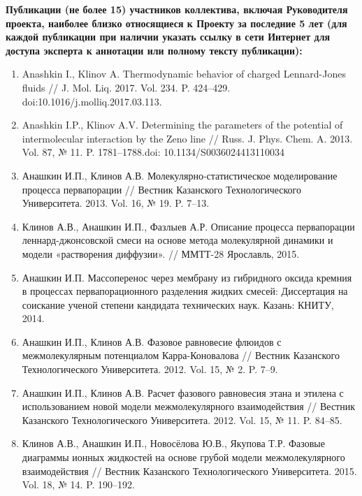 \textbf{Публикации (не более 15) участников коллектива, включая Руководителя проекта, наиболее близко относящиеся к Проекту за последние 5 лет (для каждой публикации при наличии указать ссылку в сети Интернет для доступа эксперта к аннотации или полному тексту публикации):}
\begin{enumerate}
	\item Anashkin I., Klinov A. Thermodynamic behavior of charged Lennard-Jones fluids // J. Mol. Liq. 2017. Vol. 234. P. 424–429. doi:10.1016/j.mol\-liq.2017.03.113.
	\item	Anashkin I.P., Klinov A.V. Determining the parameters of the potential of intermolecular interaction by the Zeno line // Russ. J. Phys. Chem. A. 2013. Vol. 87, № 11. P. 1781–1788.doi: 10.1134/S0036024413110034
	\item	Анашкин И.П., Клинов А.В. Молекулярно-статистическое моделирование процесса первапорации // Вестник Казанского Технологического Университета. 2013. Vol. 16, № 19. P. 7–13.
	\item	Клинов А.В., Анашкин И.П., Фазлыев А.Р. Описание процесса первапорации леннард-джонсовской смеси на основе метода молекулярной динамики и модели «растворения диффузии». // ММТТ-28 Ярославль, 2015.
	\item	Анашкин И.П. Массоперенос через мембрану из гибридного оксида кремния в процессах первапорационного разделения жидких смесей: Диссертация на соискание ученой степени кандидата технических наук. Казань: КНИТУ, 2014.
	\item	Анашкин И.П., Клинов А.В. Фазовое равновесие флюидов с межмолекулярным потенциалом Карра-Коновалова // Вестник Казанского Технологического Университета. 2012. Vol. 15, № 2. P. 7–9.
	\item	Анашкин И.П., Клинов А.В. Расчет фазового равновесия этана и этилена с использованием новой модели межмолекулярного взаимодействия // Вестник Казанского Технологического Университета. 2012. Vol. 15, № 11. P. 84–85.
	\item	Клинов А.В., Анашкин И.П., Новосёлова Ю.В., Якупова Т.Р. Фазовые диаграммы ионных жидкостей на основе грубой модели межмолекулярного взаимодействия // Вестник Казанского Технологического Университета. 2015. Vol. 18, № 14. P. 190–192.
\end{enumerate}
	

